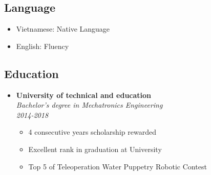 \documentclass[11pt,oneside,a4paper]{article}
\begin{document}
\begin{tcolorbox}
\begin{minipage}[t]{8cm}
\begin{tcolorbox}[grow to left by=0.6cm, colback=gray!25,colframe=white]
            \section*{Language}
            \begin{itemize}
                \item {Vietnamese: Native Language}
                \item {English: Fluency}
            \end{itemize}
            \vspace*{6\baselineskip}
        \end{tcolorbox}
    \end{minipage}
    \begin{minipage}[t]{11cm}
        \vspace*{-0.5cm}
        \begin{tcolorbox}[grow to right by=0.75cm,colback=white,colframe=white]
            \section*{Education}
            \begin{itemize}
                \item 
                {
                    \textbf{University of technical and education} \\
                    \emph{Bachelor’s degree in Mechatronics Engineering} \\
                    \emph{2014-2018}
                    \begin{itemize}[label=$\circ$]
                        \item {4 consecutive years scholarship rewarded}
                        \item {Excellent rank in graduation at University}
                        \item {Top 5 of Teleoperation Water Puppetry Robotic Contest}
                    \end{itemize}
                }
            \end{itemize}


\end{tcolorbox}
\end{minipage}
\end{tcolorbox}
\end{document}
